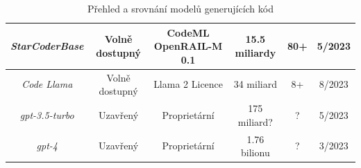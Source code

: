 \documentclass[12pt]{article}
\begin{document}
\begin{landscape}
\begin{table}[H]
\begin{tabular}{|c|c|c|c|c|c|}
                        \hline
                        \textit{StarCoderBase} & Volně dostupný & CodeML OpenRAIL-M 0.1 & 15.5 miliardy & 80+ & 5/2023 \\
                        \hline
                        \textit{Code Llama} & Volně dostupný & Llama 2 Licence & 34 miliard & 8+ & 8/2023 \\
                        \hline
                        \textit{gpt-3.5-turbo} & Uzavřený & Proprietární & 175 miliard? & ? & 5/2023 \\
                        \hline
                        \textit{gpt-4} & Uzavřený & Proprietární & 1.76 bilionu & ? & 3/2023 \\
                        \hline
                    \end{tabular}
                    \centering
                    \caption{Přehled a srovnání modelů generujících kód}
                    \label{tab:code_models_comp}
                \end{table} 
            \end{landscape}

    \newpage
    
    
	
\end{document}
